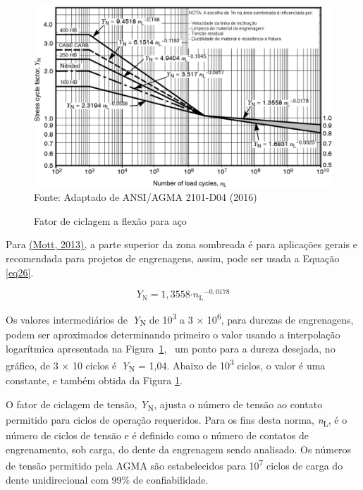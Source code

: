 \documentclass[12pt,a4paper]{article}
\begin{document}
\begin{figure}[!htb]
    \centering
    \caption{Fator de ciclagem a flexão para aço}
    \includegraphics[scale=0.5]{Imagens/Img26.png}\\
    {\footnotesize Fonte: Adaptado de ANSI/AGMA 2101-D04 (2016)}
    \label{fig:26}
\end{figure}


Para \hyperref[csl:21]{(Mott, 2013)}, a parte superior da zona sombreada é para
aplicações gerais e recomendada para projetos de engrenagens, assim,
pode ser usada a Equação {\ref{eq26}}.

\par\null

\begin{equation}
\label{eq26}
Y_{\mathrm{N}}\mathrm{=1,3558}\mathrm{\cdot }{n_{\mathrm{L}}}^{\mathrm{-}\mathrm{0,0178}}
\end{equation}

\par\null

Os valores intermediários de~\emph{Y}\textsubscript{N} de
10\textsuperscript{3} a 3 × 10\textsuperscript{6}, para durezas de
engrenagens, podem ser aproximados determinando primeiro o valor usando
a interpolação logarítmica apresentada na
Figura~{\ref{fig:26}},~ um ponto para a dureza
desejada, no gráfico, de 3 × 10 ciclos é~\emph{Y}\textsubscript{N} = 1,04.
Abaixo de 10\textsuperscript{3} ciclos, o valor é uma constante, e
também obtida da Figura {\ref{fig:26}}.

O fator de ciclagem de tensão, \emph{Y}\textsubscript{N}, ajusta o
número de tensão ao contato permitido para ciclos de operação
requeridos. Para os fins desta norma, \emph{n}\textsubscript{L}, é o
número de ciclos de tensão e é definido como o número de contatos de
engrenamento, sob carga, do dente da engrenagem sendo analisado. Os
números de tensão permitido pela AGMA são estabelecidos para
10\textsuperscript{7} ciclos de carga do dente unidirecional com 99\% de
confiabilidade.
\end{document}
